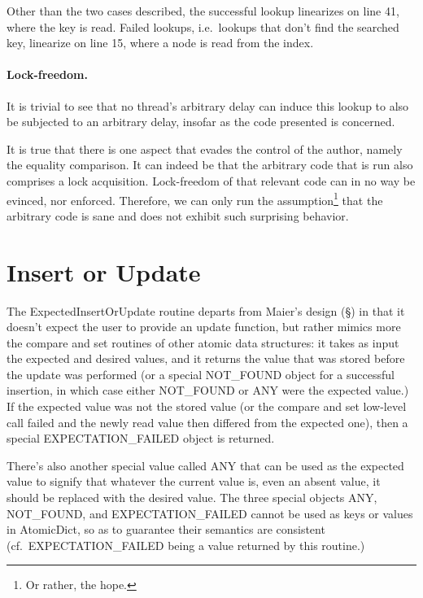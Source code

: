 Other than the two cases described, the successful lookup linearizes on line 41, where the key is read.
Failed lookups, i.e.\ lookups that don't find the searched key, linearize on line 15, where a node is read from the index.


\paragraph{Lock-freedom.}

It is trivial to see that no thread's arbitrary delay can induce this lookup to also be subjected to an arbitrary delay, insofar as the code presented is concerned.

It is true that there is one aspect that evades the control of the author, namely the equality comparison.
It can indeed be that the arbitrary code that is run also comprises a lock acquisition.
Lock-freedom of that relevant code can in no way be evinced, nor enforced.
Therefore, we can only run the assumption\footnote{%
	Or rather, the hope.
} that the arbitrary code is sane and does not exhibit such surprising behavior.


\section{Insert or Update}\label{sec:insert-or-update}



The ExpectedInsertOrUpdate routine departs from Maier's design (\S\cite[Algorithm~1]{maier}) in that it doesn't expect the user to provide an update function, but rather mimics more the compare and set routines of other atomic data structures: it takes as input the expected and desired values, and it returns the value that was stored before the update was performed (or a special NOT\_FOUND object for a successful insertion, in which case either NOT\_FOUND or ANY were the expected value.)
If the expected value was not the stored value (or the compare and set low-level call failed and the newly read value then differed from the expected one), then a special EXPECTATION\_FAILED object is returned.

There's also another special value called ANY that can be used as the expected value to signify that whatever the current value is, even an absent value, it should be replaced with the desired value.
The three special objects ANY, NOT\_FOUND, and EXPECTATION\_FAILED cannot be used as keys or values in AtomicDict, so as to guarantee their semantics are consistent (cf.\ EXPECTATION\_FAILED being a value returned by this routine.)

